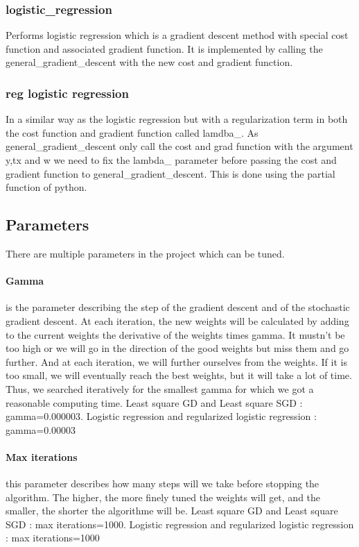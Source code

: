 \documentclass[10pt,conference,compsocconf]{IEEEtran}
\begin{document}
\subsubsection{logistic\_regression}
Performs logistic regression which is a gradient descent method with special cost function and associated gradient function. It is implemented by calling the general\_gradient\_descent with the new cost and gradient function.

\subsubsection{reg logistic regression}
In a similar way as the logistic regression but with a regularization term in both the cost function and gradient function called lamdba\_. As general\_gradient\_descent only call the cost and grad function with the argument y,tx and w we need to fix the lambda\_ parameter before passing the cost and gradient function to general\_gradient\_descent. This is done using the partial function of python.

\subsection{Parameters}
There are multiple parameters in the project which can be tuned. 
\paragraph{Gamma} is the parameter describing the step of the gradient descent and of the stochastic gradient descent. At each iteration, the new weights will be calculated by adding to the current weights the derivative of the weights times gamma. It mustn’t be too high or we will go in the direction of the good weights but miss them and go further. And at each iteration, we will further ourselves from the weights. If it is too small, we will eventually reach the best weights, but it will take a lot of time. Thus, we searched iteratively for the smallest gamma for which we got a reasonable computing time.
Least square GD and Least square SGD : gamma=0.000003.
Logistic regression and regularized logistic regression : gamma=0.00003
\paragraph{Max iterations} this parameter describes how many steps will we take before stopping the algorithm. The higher, the more finely tuned the weights will get, and the smaller, the shorter the algorithme will be. 
Least square GD and Least square SGD : max iterations=1000.
Logistic regression and regularized logistic regression :  max iterations=1000
\end{document}
